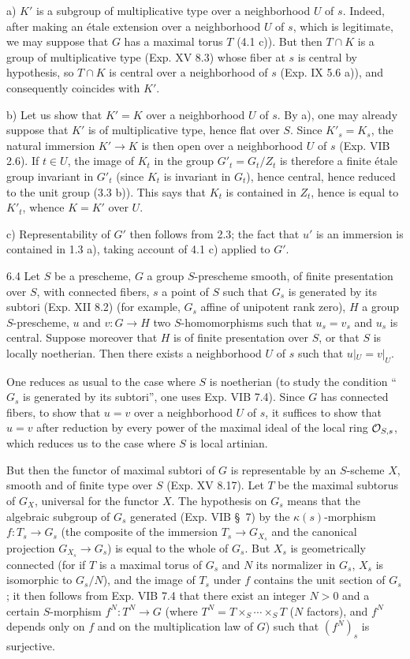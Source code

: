 \noindent a) $K'$ is a subgroup of multiplicative type over a neighborhood $U$ of $s$. Indeed, after making an étale extension over a neighborhood $U$ of $s$, which is legitimate, we may suppose that $G$ has a maximal torus $T$ (4.1 c)). But then $T\cap K$ is a group of multiplicative type (Exp. XV 8.3) whose fiber at $s$ is central by hypothesis, so $T\cap K$ is central over a neighborhood of $s$ (Exp. IX 5.6 a)), and consequently coincides with $K'$.

\noindent b) Let us show that $K'=K$ over a neighborhood $U$ of $s$. By a), one may already suppose that $K'$ is of multiplicative type, hence flat over $S$. Since $K'_s=K_s$, the natural immersion $K'\to K$ is then open over a neighborhood $U$ of $s$ (Exp. VIB 2.6). If $t\in U$, the image of $K_t$ in the group $G'_t=G_t/Z_t$ is therefore a finite étale group invariant in $G'_t$ (since $K_t$ is invariant in $G_t$), hence central, hence reduced to the unit group (3.3 b)). This says that $K_t$ is contained in $Z_t$, hence is equal to $K'_t$, whence $K=K'$ over $U$.

\noindent c) Representability of $G'$ then follows from 2.3; the fact that $u'$ is an immersion is contained in 1.3 a), taking account of 4.1 c) applied to $G'$.
\begin{proposition}{6.4}\label{XVI.6.4}
Let $S$ be a prescheme, $G$ a group $S$-prescheme smooth, of finite presentation over $S$, with connected fibers, $s$ a point of $S$ such that $G_s$ is generated by its subtori (Exp. XII 8.2) (for example, $G_s$ affine of unipotent rank zero), $H$ a group $S$-prescheme, $u$ and $v:G\to H$ two $S$-homomorphisms such that $u_s=v_s$ and $u_s$ is central. Suppose moreover that $H$ is of finite presentation over $S$, or that $S$ is locally noetherian. Then there exists a neighborhood $U$ of $s$ such that $u|_U=v|_U$.
\end{proposition}
One reduces as usual to the case where $S$ is noetherian (to study the condition ``$G_s$ is generated by its subtori'', one uses Exp. VIB 7.4). Since $G$ has connected fibers, to show that $u=v$ over a neighborhood $U$ of $s$, it suffices to show that $u=v$ after reduction by every power of the maximal ideal of the local ring $\mathcal{O}_{S,s}$, which reduces us to the case where $S$ is local artinian.

But then the functor of maximal subtori of $G$ is representable by an $S$-scheme $X$, smooth and of finite type over $S$ (Exp. XV 8.17). Let $T$ be the maximal subtorus of $G_X$, universal for the functor $X$. The hypothesis on $G_s$ means that the algebraic subgroup of $G_s$ generated (Exp. VIB \S\ 7) by the $\kappa(s)$-morphism $f:T_s\to G_s$ (the composite of the immersion $T_s\to G_{X_s}$ and the canonical projection $G_{X_s}\to G_s$) is equal to the whole of $G_s$. But $X_s$ is geometrically connected (for if $T$ is a maximal torus of $G_s$ and $N$ its normalizer in $G_s$, $X_s$ is isomorphic to $G_s/N$), and the image of $T_s$ under $f$ contains the unit section of $G_s$; it then follows from Exp. VIB 7.4 that there exist an integer $N>0$ and a certain $S$-morphism $f^N:T^N\to G$ (where $T^N=T\times_S\cdots\times_S T$ ($N$ factors), and $f^N$ depends only on $f$ and on the multiplication law of $G$) such that $(f^N)_s$ is surjective.

